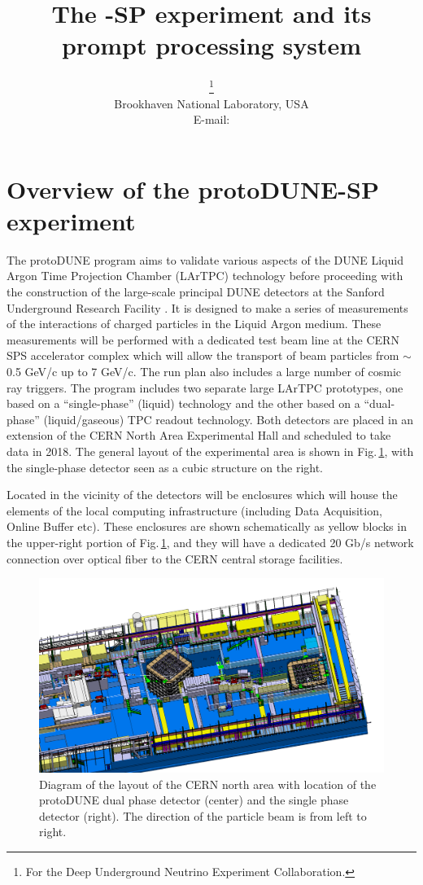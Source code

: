 \documentclass{PoS}
\title{The \pd-SP experiment and its prompt processing system}
\author{\speaker{Maxim Potekhin}\thanks{For the Deep Underground Neutrino Experiment Collaboration.}\\
        Brookhaven National Laboratory, USA\\
        E-mail: \email{potekhin@bnl.gov}}
\newcommand{\pd}{protoDUNE\xspace}
\begin{document}
\section{Overview of the protoDUNE-SP experiment}
The \pd program aims to validate various aspects of the DUNE  Liquid Argon Time Projection Chamber (LArTPC)  technology 
before proceeding with the construction of the large-scale principal DUNE detectors at the Sanford Underground Research
Facility \cite{cdrVol1, cdrVol4}. It  is designed to make a series of measurements of the interactions of
charged particles in the Liquid Argon medium.  These measurements will be performed with a dedicated test
beam line  at the CERN SPS accelerator complex which will allow the transport of beam particles from $\sim$0.5 GeV/c
up to 7 GeV/c. The run plan also includes a large number of cosmic ray triggers. The program includes
two separate large LArTPC prototypes, one based on a ``single-phase'' (liquid) technology and
the other based on a ``dual-phase'' (liquid/gaseous) TPC readout technology.
Both detectors are placed in an extension of the CERN North Area Experimental Hall and  scheduled
to take data in 2018. The general layout of the experimental area is shown in Fig.\,\ref{fig:np02np04}, with
the single-phase detector seen as a cubic structure on the right.

Located in the vicinity of the detectors will be enclosures which will house the elements of the local computing infrastructure
(including Data Acquisition, Online Buffer etc). These enclosures are shown schematically as yellow blocks in the
upper-right portion of Fig.\,\ref{fig:np02np04}, and they will have a dedicated 20 Gb/s
network connection over optical fiber to the CERN central storage facilities.

\begin{figure}[tb]
\centering\includegraphics[width=1.0\textwidth]{np02np04.png}
\caption{\label{fig:np02np04}Diagram of the layout of the CERN north area with
  location of the protoDUNE dual phase detector (center) and the single
  phase detector (right). The direction of the particle beam is from left to right.}
\end{figure}
\end{document}
